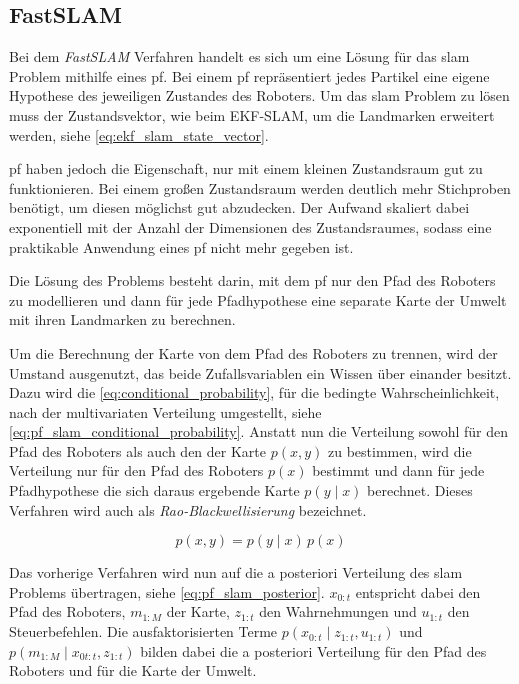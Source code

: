 \subsection{FastSLAM}

Bei dem \textit{FastSLAM} Verfahren handelt es sich um eine Lösung für das \gls{slam} Problem mithilfe eines \gls{pf}. Bei einem \gls{pf} repräsentiert jedes Partikel eine eigene Hypothese  des jeweiligen Zustandes des Roboters. Um das \gls{slam} Problem zu lösen muss der Zustandsvektor, wie beim EKF-SLAM, um die Landmarken erweitert werden, siehe \autoref{eq:ekf_slam_state_vector}.

\gls{pf} haben jedoch die Eigenschaft, nur mit einem kleinen Zustandsraum gut zu funktionieren. Bei einem großen Zustandsraum werden deutlich mehr Stichproben benötigt, um diesen möglichst gut abzudecken. Der Aufwand skaliert dabei exponentiell mit der Anzahl der Dimensionen des Zustandsraumes, sodass eine praktikable Anwendung eines \gls{pf} nicht mehr gegeben ist.

Die Lösung des Problems besteht darin, mit dem \gls{pf} nur den Pfad des Roboters zu modellieren und dann für jede Pfadhypothese eine separate Karte der Umwelt mit ihren Landmarken zu berechnen.

Um die Berechnung der Karte von dem Pfad des Roboters zu trennen, wird der Umstand ausgenutzt, das beide Zufallsvariablen ein Wissen über einander besitzt. Dazu wird die \autoref{eq:conditional_probability}, für die bedingte Wahrscheinlichkeit, nach der multivariaten Verteilung umgestellt, siehe \autoref{eq:pf_slam_conditional_probability}. Anstatt nun die Verteilung sowohl für den Pfad des Roboters als auch den der Karte $p(x, y)$ zu bestimmen, wird die Verteilung nur für den Pfad des Roboters $p(x)$ bestimmt und dann für jede Pfadhypothese die sich daraus ergebende Karte $p(y \mid x)$ berechnet. Dieses Verfahren wird auch als \textit{Rao-Blackwellisierung} bezeichnet.

\begin{equation}
p(x, y) = p(y \mid x) \, p(x) \label{eq:pf_slam_conditional_probability}
\end{equation}

Das vorherige Verfahren wird nun auf die a posteriori Verteilung des \gls{slam} Problems übertragen, siehe \autoref{eq:pf_slam_posterior}. $x_{0:t}$ entspricht dabei den Pfad des Roboters, $m_{1:M}$ der Karte, $z_{1:t}$ den Wahrnehmungen und $u_{1:t}$ den Steuerbefehlen. Die ausfaktorisierten Terme $p(x_{0:t} \mid z_{1:t}, u_{1:t})$ und $p(m_{1:M} \mid x_{0t:t}, z_{1:t})$ bilden dabei die a posteriori Verteilung für den Pfad des Roboters und für die Karte der Umwelt.

